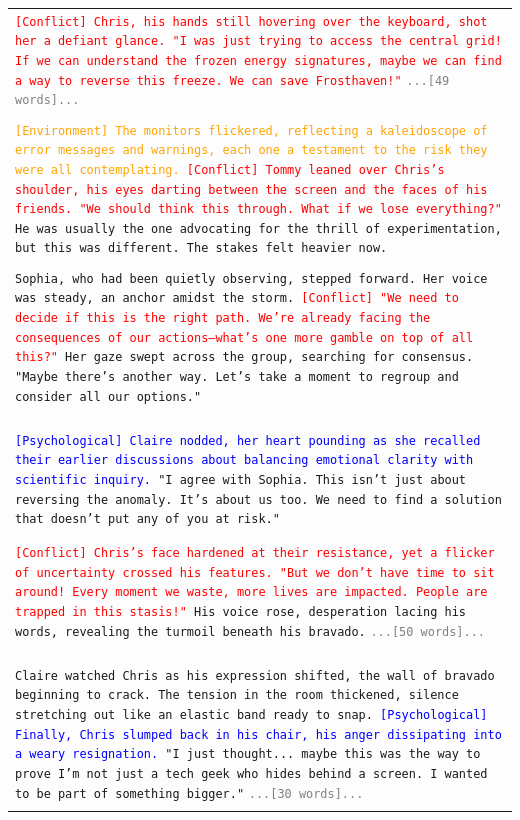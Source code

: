 \documentclass[letterpaper]{article} %
\begin{document}
\begin{small}
\begin{longtable}{p{\textwidth}}
    \texttt{\textcolor{red}{[Conflict] Chris, his hands still hovering over the keyboard, shot her a defiant glance. "I was just trying to access the central grid! If we can understand the frozen energy signatures, maybe we can find a way to reverse this freeze. We can save Frosthaven!"}}
    \texttt{\textcolor{gray}{...[49 words]...}} \\\\

    \texttt{\textcolor{orange}{[Environment] The monitors flickered, reflecting a kaleidoscope of error messages and warnings, each one a testament to the risk they were all contemplating.} \textcolor{red}{[Conflict] Tommy leaned over Chris's shoulder, his eyes darting between the screen and the faces of his friends. "We should think this through. What if we lose everything?"} He was usually the one advocating for the thrill of experimentation, but this was different. The stakes felt heavier now.} \\\\

    \texttt{Sophia, who had been quietly observing, stepped forward. Her voice was steady, an anchor amidst the storm. \textcolor{red}{[Conflict] "We need to decide if this is the right path. We're already facing the consequences of our actions—what's one more gamble on top of all this?"} Her gaze swept across the group, searching for consensus. "Maybe there's another way. Let's take a moment to regroup and consider all our options."} \\\\

    \texttt{\textcolor{blue}{[Psychological] Claire nodded, her heart pounding as she recalled their earlier discussions about balancing emotional clarity with scientific inquiry.} "I agree with Sophia. This isn't just about reversing the anomaly. It's about us too. We need to find a solution that doesn't put any of you at risk."}

    \texttt{\textcolor{red}{[Conflict] Chris's face hardened at their resistance, yet a flicker of uncertainty crossed his features. "But we don't have time to sit around! Every moment we waste, more lives are impacted. People are trapped in this stasis!"} His voice rose, desperation lacing his words, revealing the turmoil beneath his bravado.}
    \texttt{\textcolor{gray}{...[50 words]...}} \\\\

    \texttt{Claire watched Chris as his expression shifted, the wall of bravado beginning to crack. The tension in the room thickened, silence stretching out like an elastic band ready to snap. \textcolor{blue}{[Psychological] Finally, Chris slumped back in his chair, his anger dissipating into a weary resignation.} "I just thought... maybe this was the way to prove I'm not just a tech geek who hides behind a screen. I wanted to be part of something bigger."}
    \texttt{\textcolor{gray}{...[30 words]...}} \\\\


\end{longtable}
\end{small}
\end{document}
